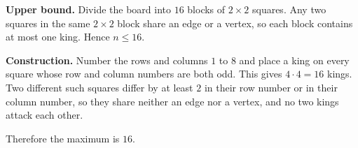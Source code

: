 \textbf{Upper bound.} Divide the board into $16$ blocks of $2\times2$ squares. Any two squares in the same $2\times2$ block share an edge or a vertex, so each block contains at most one king. Hence $n\le16$.

\textbf{Construction.} Number the rows and columns $1$ to $8$ and place a king on every square whose row and column numbers are both odd. This gives $4\cdot4=16$ kings. Two different such squares differ by at least $2$ in their row number or in their column number, so they share neither an edge nor a vertex, and no two kings attack each other.

Therefore the maximum is $\boxed{16}$.
